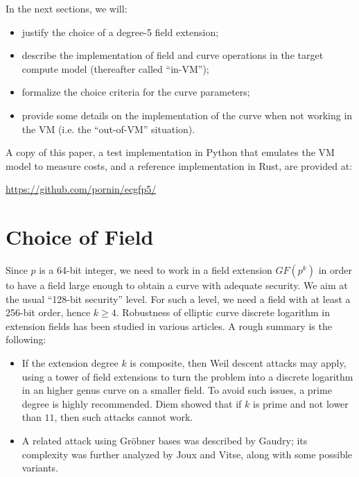 \documentclass{llncs}
\newcommand{\GF}{GF}
\begin{document}
In the next sections, we will:
\begin{itemize}

    \item justify the choice of a degree-5 field extension;

    \item describe the implementation of field and curve operations in the
    target compute model (thereafter called ``in-VM'');

    \item formalize the choice criteria for the curve parameters;

    \item provide some details on the implementation of the curve when
    not working in the VM (i.e. the ``out-of-VM'' situation).

\end{itemize}

A copy of this paper, a test implementation in Python that emulates the
VM model to measure costs, and a reference implementation in Rust, are
provided at:
\begin{center}
    \url{https://github.com/pornin/ecgfp5/}
\end{center}

\section{Choice of Field}

Since $p$ is a 64-bit integer, we need to work in a field extension
$\GF(p^k)$ in order to have a field large enough to obtain a curve with
adequate security. We aim at the usual ``128-bit security'' level. For
such a level, we need a field with at least a 256-bit order, hence $k
\geq 4$. Robustness of elliptic curve discrete logarithm in extension
fields has been studied in various articles. A rough summary is the
following:
\begin{itemize}

    \item If the extension degree $k$ is composite, then Weil descent
    attacks may apply, using a tower of field extensions to turn the
    problem into a discrete logarithm in an higher genus curve on a
    smaller field\cite{GauHesSma2002,AriMatNagShi2004}. To avoid such
    issues, a prime degree is highly recommended. Diem showed that if
    $k$ is prime and not lower than $11$, then such attacks cannot
    work\cite{Die2003}.

    \item A related attack using Gröbner bases was described by
    Gaudry\cite{Gau2009}; its complexity was further analyzed by Joux
    and Vitse, along with some possible variants\cite{JouVit2013}.

\end{itemize}
\end{document}
